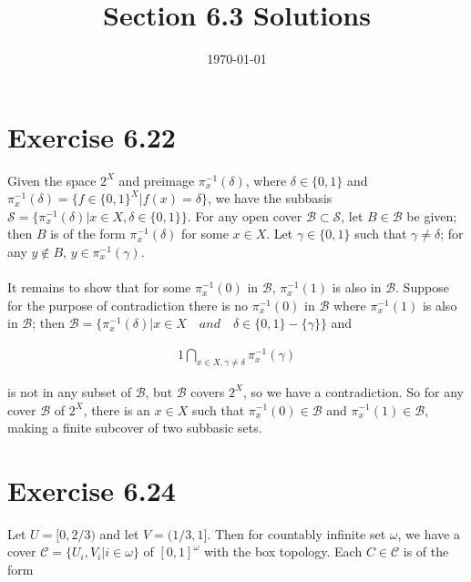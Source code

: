 \documentclass{article}
\title{\textbf{Section 6.3 Solutions}}
\date{}
\date\today
\begin{document}
\maketitle %

\thispagestyle{firstpage}
\section*{Exercise 6.22}

Given the space $2^X$ and preimage $\pi^{-1}_x(\delta)$, where $\delta \in \{0, 1\}$ and 
$\pi^{-1}_x(\delta) = \{f \in \{0, 1\}^X | f(x) = \delta \}$, we have the subbasis $\mathcal{S} = \{\pi^{-1}_x(\delta) | x \in X, \delta \in \{0,1\} \}$.  
For any open cover $\mathcal{B} \subset \mathcal{S}$, let $B \in \mathcal{B}$ be given; then $B$ is of the form $\pi^{-1}_x(\delta)$ for some $x \in X$.  
Let $\gamma \in \{0,1\}$ such that $\gamma \neq \delta$; for any $y \notin B$, $y \in \pi^{-1}_x(\gamma)$.  \\ 
\\ 
It remains to show that for some $\pi^{-1}_x(0)$ in $\mathcal{B}$, $\pi^{-1}_x(1)$ is also in $\mathcal{B}$.  Suppose for the 
purpose of contradiction there is no $\pi^{-1}_x(0)$ in $\mathcal{B}$ where $\pi^{-1}_x(1)$ is also in $\mathcal{B}$;  
then $\mathcal{B} = \{ \pi^{-1}_x(\delta) | x \in X \quad and \quad \delta \in \{0, 1\} - \{\gamma \} \}$ and 

\begin{alignat*}{1}
    \bigcap _{x \in X, \gamma \neq \delta} \pi^{-1}_x(\gamma)
\end{alignat*}

is not in any subset of $\mathcal{B}$, but $\mathcal{B}$ covers $2^X$, so we have a 
contradiction.  So for any cover $\mathcal{B}$ of $2^X$, there is an $x \in X$ such that 
$\pi^{-1}_x(0) \in \mathcal{B}$ and $\pi^{-1}_x(1) \in \mathcal{B}$, making a finite subcover 
of two subbasic sets.

\newpage 


\section*{Exercise 6.24}

Let $U = [0, 2/3)$ and let $V = (1/3, 1]$.  Then for countably infinite set $\omega$, we have a cover 
$\mathcal{C} = \{U_i, V_i | i \in \omega \}$ of $[0, 1]^\omega$ with the 
box topology.  Each $C \in \mathcal{C}$ is of the form 
\end{document}
